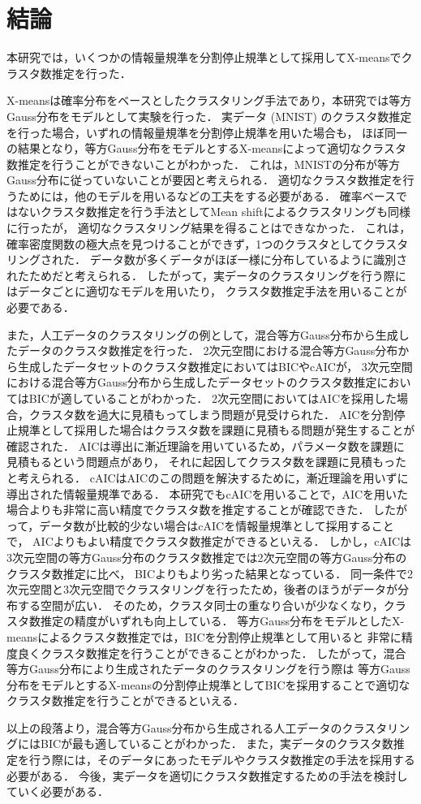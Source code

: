 \section{結論}

本研究では，いくつかの情報量規準を分割停止規準として採用してX-meansでクラスタ数推定を行った．

X-meansは確率分布をベースとしたクラスタリング手法であり，本研究では等方Gauss分布をモデルとして実験を行った．
実データ (MNIST) のクラスタ数推定を行った場合，いずれの情報量規準を分割停止規準を用いた場合も，
ほぼ同一の結果となり，等方Gauss分布をモデルとするX-meansによって適切なクラスタ数推定を行うことができないことがわかった．
これは，MNISTの分布が等方Gauss分布に従っていないことが要因と考えられる．
適切なクラスタ数推定を行うためには，他のモデルを用いるなどの工夫をする必要がある．
確率ベースではないクラスタ数推定を行う手法としてMean shiftによるクラスタリングも同様に行ったが，
適切なクラスタリング結果を得ることはできなかった．
これは，確率密度関数の極大点を見つけることができず，1つのクラスタとしてクラスタリングされた．
データ数が多くデータがほぼ一様に分布しているように識別されたためだと考えられる．
したがって，実データのクラスタリングを行う際にはデータごとに適切なモデルを用いたり，
クラスタ数推定手法を用いることが必要である．

また，人工データのクラスタリングの例として，混合等方Gauss分布から生成したデータのクラスタ数推定を行った．
2次元空間における混合等方Gauss分布から生成したデータセットのクラスタ数推定においてはBICやcAICが，
3次元空間における混合等方Gauss分布から生成したデータセットのクラスタ数推定においてはBICが適していることがわかった．
2次元空間においてはAICを採用した場合，クラスタ数を過大に見積もってしまう問題が見受けられた．
AICを分割停止規準として採用した場合はクラスタ数を課題に見積もる問題が発生することが確認された．
AICは導出に漸近理論を用いているため，パラメータ数を課題に見積もるという問題点があり，
それに起因してクラスタ数を課題に見積もったと考えられる．
cAICはAICのこの問題を解決するために，漸近理論を用いずに導出された情報量規準である．
本研究でもcAICを用いることで，AICを用いた場合よりも非常に高い精度でクラスタ数を推定することが確認できた．
したがって，データ数が比較的少ない場合はcAICを情報量規準として採用することで，
AICよりもよい精度でクラスタ数推定ができるといえる．
しかし，cAICは3次元空間の等方Gauss分布のクラスタ数推定では2次元空間の等方Gauss分布のクラスタ数推定に比べ，
BICよりもより劣った結果となっている．
同一条件で2次元空間と3次元空間でクラスタリングを行ったため，後者のほうがデータが分布する空間が広い．
そのため，クラスタ同士の重なり合いが少なくなり，クラスタ数推定の精度がいずれも向上している．
等方Gauss分布をモデルとしたX-meansによるクラスタ数推定では，BICを分割停止規準として用いると
非常に精度良くクラスタ数推定を行うことができることがわかった．
したがって，混合等方Gauss分布により生成されたデータのクラスタリングを行う際は
等方Gauss分布をモデルとするX-meansの分割停止規準としてBICを採用することで適切なクラスタ数推定を行うことができるといえる．

以上の段落より，混合等方Gauss分布から生成される人工データのクラスタリングにはBICが最も適していることがわかった．
また，実データのクラスタ数推定を行う際には，そのデータにあったモデルやクラスタ数推定の手法を採用する必要がある．
今後，実データを適切にクラスタ数推定するための手法を検討していく必要がある．
